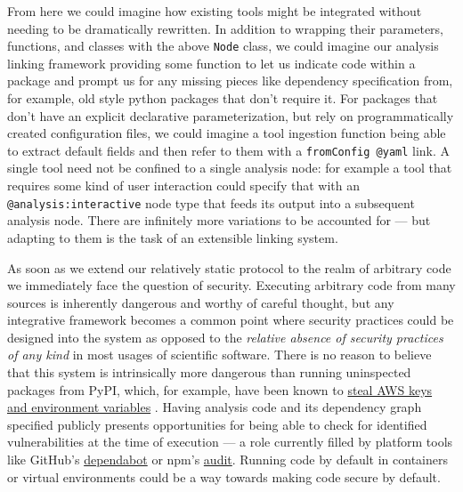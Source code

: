 From here we could imagine how existing tools might be integrated
without needing to be dramatically rewritten. In addition to wrapping
their parameters, functions, and classes with the above \texttt{Node}
class, we could imagine our analysis linking framework providing some
function to let us indicate code within a package and prompt us for any
missing pieces like dependency specification from, for example, old
style python packages that don't require it. For packages that don't
have an explicit declarative parameterization, but rely on
programmatically created configuration files, we could imagine a tool
ingestion function being able to extract default fields and then refer
to them with a \texttt{fromConfig\ @yaml} link. A single tool need not
be confined to a single analysis node: for example a tool that requires
some kind of user interaction could specify that with an
\texttt{@analysis:interactive} node type that feeds its output into a
subsequent analysis node. There are infinitely more variations to be
accounted for --- but adapting to them is the task of an extensible
linking system.

As soon as we extend our relatively static protocol to the realm of
arbitrary code we immediately face the question of security. Executing
arbitrary code from many sources is inherently dangerous and worthy of
careful thought, but any integrative framework becomes a common point
where security practices could be designed into the system as opposed to
the \emph{relative absence of security practices of any kind} in most
usages of scientific software. There is no reason to believe that this
system is intrinsically more dangerous than running uninspected packages
from PyPI, which, for example, have been known to
\href{https://blog.sonatype.com/python-packages-upload-your-aws-keys-env-vars-secrets-to-web}{steal
AWS keys and environment variables} \citep{sharmaPythonPackagesUpload2022} . Having analysis code and its
dependency graph specified publicly presents opportunities for being
able to check for identified vulnerabilities at the time of execution
--- a role currently filled by platform tools like GitHub's
\href{https://github.com/dependabot}{dependabot} or npm's
\href{https://docs.npmjs.com/auditing-package-dependencies-for-security-vulnerabilities}{audit}.
Running code by default in containers or virtual environments could be a
way towards making code secure by default.

